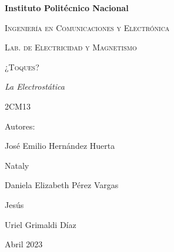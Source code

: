 \documentclass[14pt]{article}
\begin{document}
	\lhead{}
	\begin{titlepage}
		\begin{figure}[t]
			\hspace{0.6\textwidth}
		\end{figure}
		\centering
		{\bfseries\Huge Instituto Politécnico Nacional \par}
		\vspace{1cm}
		{\scshape\Large Ingeniería en Comunicaciones y Electrónica \par}
		\vspace{0.3cm}
		{\scshape\Large Lab. de Electricidad y Magnetismo  \par}
		\vspace{1cm}
		{\scshape\Huge ¿Toques? \par}
		\vspace{1cm}
		{\itshape\Large La Electrostática\par}
		{\Large 2CM13\par}
		\vfill
		{\Large Autores: \par}
		{\Large José Emilio Hernández Huerta \par}
		{\Large Nataly \par}
		{\Large Daniela Elizabeth Pérez Vargas \par}
		{\Large Jesús \par}
		{\Large Uriel Grimaldi Díaz  \par}
		\vfill
		{\Large Abril 2023 \par}
	\end{titlepage}
	 \tableofcontents
	 
\end{document}
